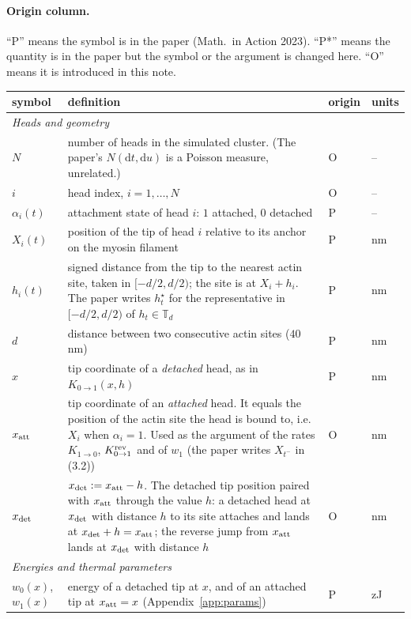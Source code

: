 \documentclass[11pt,a4paper]{article}
\newcommand{\dd}{\mathrm{d}}
\begin{document}
\paragraph{Origin column.} ``P'' means the symbol is in the paper (Math.\ in Action 2023). ``P*'' means the quantity is in the paper but the symbol or the argument is changed here. ``O'' means it is introduced in this note.

{\small
\begin{longtable}{p{2.5cm}p{8.5cm}p{1.0cm}p{1.9cm}}
\toprule
symbol & definition & origin & units \\
\midrule
\endhead
\multicolumn{4}{l}{\emph{Heads and geometry}}\\
$N$ & number of heads in the simulated cluster. (The paper's $N(\dd t,\dd u)$ is a Poisson measure, unrelated.) & O & --\\
$i$ & head index, $i=1,\dots,N$ & O & --\\
$\alpha_i(t)$ & attachment state of head $i$: $1$ attached, $0$ detached & P & --\\
$X_i(t)$ & position of the tip of head $i$ relative to its anchor on the myosin filament & P & nm\\
$h_i(t)$ & signed distance from the tip to the nearest actin site, taken in $[-d/2,d/2)$; the site is at $X_i+h_i$. The paper writes $h^\star_t$ for the representative in $[-d/2,d/2)$ of $h_t\in\mathbb T_d$ & P & nm\\
$d$ & distance between two consecutive actin sites ($40$ nm) & P & nm\\
$x$ & tip coordinate of a \emph{detached} head, as in $K_{0\to1}(x,h)$ & P & nm\\
$x_{\rm att}$ & tip coordinate of an \emph{attached} head. It equals the position of the actin site the head is bound to, i.e.\ $X_i$ when $\alpha_i=1$. Used as the argument of the rates $K_{1\to0}$, $K^{\rm rev}_{0\to1}$ and of $w_1$ (the paper writes $X_{t^-}$ in (3.2)) & O & nm\\
$x_{\rm det}$ & $x_{\rm det}:=x_{\rm att}-h$. The detached tip position paired with $x_{\rm att}$ through the value $h$: a detached head at $x_{\rm det}$ with distance $h$ to its site attaches and lands at $x_{\rm det}+h=x_{\rm att}$; the reverse jump from $x_{\rm att}$ lands at $x_{\rm det}$ with distance $h$ & O & nm\\
\midrule
\multicolumn{4}{l}{\emph{Energies and thermal parameters}}\\
$w_0(x)$, $w_1(x)$ & energy of a detached tip at $x$, and of an attached tip at $x_{\rm att}=x$ (Appendix~\ref{app:params}) & P & zJ\\

\end{longtable}}
\end{document}
